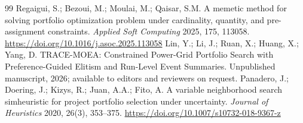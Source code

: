 \documentclass[applsci,article,submit,moreauthors]{Definitions/mdpi}
\begin{document}
\begin{thebibliography}{99}
 Regaigui, S.; Bezoui, M.; Moulai, M.; Qaisar, S.M. A memetic method for solving portfolio optimization problem under cardinality, quantity, and pre-assignment constraints. \emph{Applied Soft Computing} 2025, 175, 113058. \url{https://doi.org/10.1016/j.asoc.2025.113058}
 Lin, Y.; Li, J.; Ruan, X.; Huang, X.; Yang, D. TRACE-MOEA: Constrained Power-Grid Portfolio Search with Preference-Guided Elitism and Run-Level Event Summaries. Unpublished manuscript, 2026; available to editors and reviewers on request.
 Panadero, J.; Doering, J.; Kizys, R.; Juan, A.A.; Fito, A. A variable neighborhood search simheuristic for project portfolio selection under uncertainty. \emph{Journal of Heuristics} 2020, 26(3), 353--375. \url{https://doi.org/10.1007/s10732-018-9367-z}
\end{thebibliography}
\end{document}
